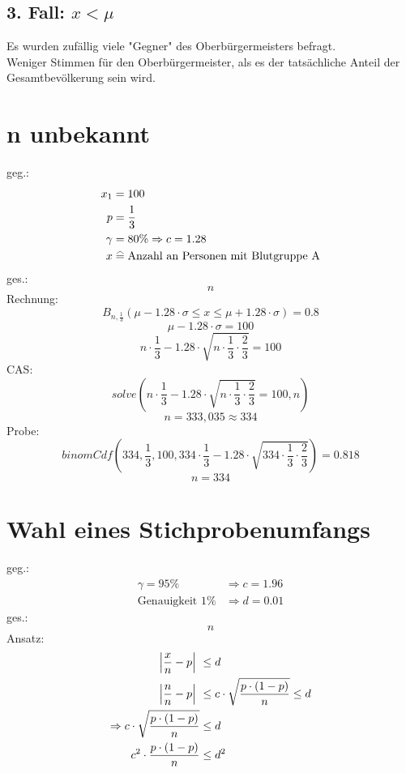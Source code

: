 \documentclass[a4paper,12pt]{article}
\newcommand\equalhat{\mathrel{\stackon[1.5pt]{=}{\stretchto{%
    \scalerel*[\widthof{=}]{\wedge}{\rule{1ex}{3ex}}}{0.5ex}}}}
\begin{document}
\subsection*{3. Fall: $x < \mu$}
Es wurden zufällig viele "Gegner" des Oberbürgermeisters befragt.\\
Weniger Stimmen für den Oberbürgermeister, als es der tatsächliche Anteil der Gesamtbevölkerung sein wird.\\
\pagebreak
\section{n unbekannt}
geg.:
\begin{equation*}
\begin{split}
x_{1} & = 100\\
p & = \frac{1}{3}\\
\gamma & = 80\% \Rightarrow c = 1.28\\
x & \equalhat \text{Anzahl an Personen mit Blutgruppe A}
\end{split}
\end{equation*}
ges.:
$$n$$
Rechnung:\\
$$B_{n, \frac{1}{3}}(\mu - 1.28 \cdot \sigma \leq x \leq \mu + 1.28 \cdot \sigma) = 0.8$$
$$\mu - 1.28 \cdot \sigma = 100$$
$$n \cdot \frac{1}{3} - 1.28 \cdot \sqrt{n \cdot \frac{1}{3} \cdot \frac{2}{3}} = 100$$
CAS:\\
$$solve(n \cdot \frac{1}{3} - 1.28 \cdot \sqrt{n \cdot \frac{1}{3} \cdot \frac{2}{3}} = 100, n)$$
$$n = 333,035 \approx 334$$
Probe:\\
$$binomCdf(334,\frac{1}{3}, 100, 334 \cdot \frac{1}{3} - 1.28 \cdot \sqrt{334 \cdot \frac{1}{3} \cdot \frac{2}{3}}) = 0.818$$
$$n = 334$$
\pagebreak
\section{Wahl eines Stichprobenumfangs}
geg.:
\begin{equation*}
\begin{split}
\gamma = 95\% & \Rightarrow c = 1.96\\
\text{Genauigkeit }1\% & \Rightarrow d = 0.01
\end{split}
\end{equation*}
ges.:
$$n$$
Ansatz:
\begin{equation*}
\begin{split}
\Big{|} \frac{x}{n} - p \Big{|}\ & \leq d\\
\Big{|} \frac{n}{n} - p \Big{|}\ & \leq c \cdot \sqrt{\frac{p \cdot (1 - p)}{n}} \leq d\\
\Rightarrow c \cdot \sqrt{\frac{p \cdot (1 - p)}{n}} & \leq d\\
c^{2} \cdot \frac{p \cdot (1 - p)}{n} & \leq d^{2}
\end{split}
\end{equation*}
\end{document}
